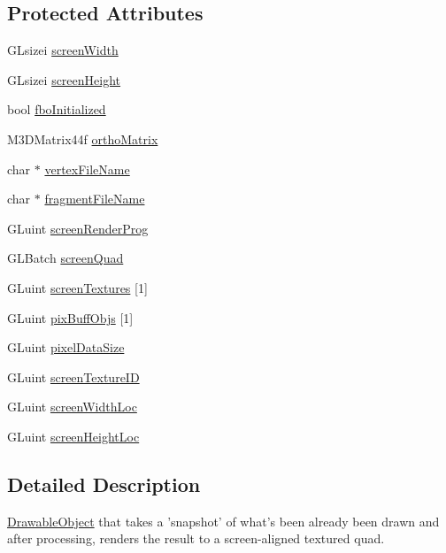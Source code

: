 \subsection*{Protected Attributes}
\begin{DoxyCompactItemize}
\item 
G\-Lsizei \hyperlink{class_screen_repaint_a547abbfc913fe100639bd66b350991db}{screen\-Width}
\item 
G\-Lsizei \hyperlink{class_screen_repaint_abac42d5d09d3f52c6e2567c524c03049}{screen\-Height}
\item 
bool \hyperlink{class_screen_repaint_aa611aa789845c1503ac2fca30a992168}{fbo\-Initialized}
\item 
M3\-D\-Matrix44f \hyperlink{class_screen_repaint_acb9d4f9bbb2328a04e59833932b484f5}{ortho\-Matrix}
\item 
char $\ast$ \hyperlink{class_screen_repaint_a7052a5a8a1d72dcdff0268179a3f54ab}{vertex\-File\-Name}
\item 
char $\ast$ \hyperlink{class_screen_repaint_ac78e420a0c861ad17c63f5e0ac5473dc}{fragment\-File\-Name}
\item 
G\-Luint \hyperlink{class_screen_repaint_a89572d6a5da58811afcf33c26d007dd9}{screen\-Render\-Prog}
\item 
G\-L\-Batch \hyperlink{class_screen_repaint_a0c691cfa0f3d656b02c019edf8944b6c}{screen\-Quad}
\item 
G\-Luint \hyperlink{class_screen_repaint_affc1c0876ba5d8401938b166e6314e8c}{screen\-Textures} \mbox{[}1\mbox{]}
\item 
G\-Luint \hyperlink{class_screen_repaint_aed1d40b65dbb7b8fce5f8338c1900166}{pix\-Buff\-Objs} \mbox{[}1\mbox{]}
\item 
G\-Luint \hyperlink{class_screen_repaint_a4b009b422686af9594c19c777529ea49}{pixel\-Data\-Size}
\item 
G\-Luint \hyperlink{class_screen_repaint_afeebcd4de6dcc325a5fb59b154206823}{screen\-Texture\-I\-D}
\item 
G\-Luint \hyperlink{class_screen_repaint_a82bc1f48111a3e7a71abdd5dbce3b3e3}{screen\-Width\-Loc}
\item 
G\-Luint \hyperlink{class_screen_repaint_a18d8432e475280b99a2cdb5786129011}{screen\-Height\-Loc}
\end{DoxyCompactItemize}


\subsection{Detailed Description}
\hyperlink{class_drawable_object}{Drawable\-Object} that takes a 'snapshot' of what's been already been drawn and after processing, renders the result to a screen-\/aligned textured quad. 

